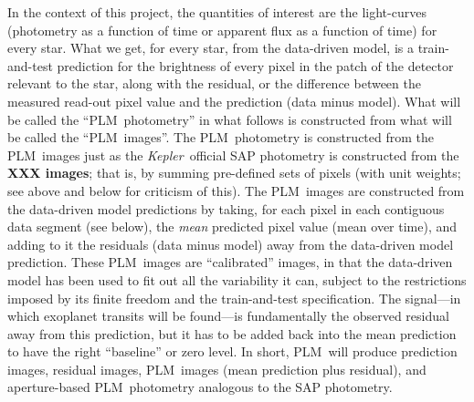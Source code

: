 \documentclass[12pt, preprint]{aastex}
\newcommand{\project}[1]{\textsl{#1}}
\newcommand{\Kepler}{\project{Kepler}}
\newcommand{\name}{PLM}
\newcommand{\todo}[1]{\textbf{#1}}
\begin{document}
In the context of this project, the quantities of interest are the light-curves
  (photometry as a function of time or apparent flux as a function of time)
  for every star.
What we get, for every star, from the data-driven model, is a train-and-test prediction
  for the brightness of every pixel in the patch of the detector relevant to the star,
  along with the residual, or the difference between the measured read-out pixel value and the prediction (data minus model).
What will be called the ``\name\ photometry'' in what follows is constructed from what will be called the ``\name\ images''.
The \name\ photometry is constructed from the \name\ images
  just as the \Kepler\ official SAP photometry is constructed from the \todo{XXX images};
  that is, by summing pre-defined sets of pixels (with unit weights; see above and below for criticism of this).
The \name\ images are constructed from the data-driven model predictions by taking,
  for each pixel in each contiguous data segment (see below),
  the \emph{mean} predicted pixel value (mean over time),
  and adding to it the residuals (data minus model) away from the data-driven model prediction.
These \name\ images are ``calibrated'' images,
  in that the data-driven model has been used to fit out all the variability it can,
  subject to the restrictions imposed by its finite freedom and the train-and-test specification.
The signal---in which exoplanet transits will be found---is fundamentally the observed residual away from this prediction,
  but it has to be added back into the mean prediction to have the right ``baseline'' or zero level.
In short, \name\ will produce prediction images, residual images, \name\ images (mean prediction plus residual),
  and aperture-based \name\ photometry analogous to the SAP photometry.
\end{document}
